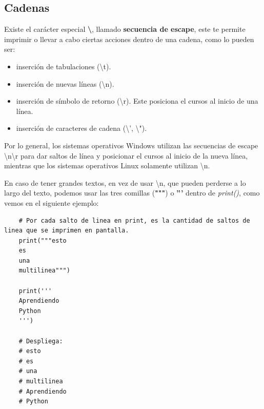 \subsection{Cadenas}
\hspace{0.55cm}Existe el carácter especial \textbf{\textbackslash}, llamado \textbf{secuencia de escape}, este te permite imprimir o llevar a cabo ciertas acciones dentro de una cadena, como lo pueden ser:
\begin{itemize}
	\item inserción de tabulaciones (\textbackslash t).
	\item inserción de nuevas líneas (\textbackslash n).
	\item inserción de símbolo de retorno (\textbackslash r). Este posiciona el cursos al inicio de una línea.
	\item inserción de caracteres de cadena (\textbackslash ', \textbackslash ").
\end{itemize}

Por lo general, los sistemas operativos Windows utilizan las secuencias de escape \textbackslash n\textbackslash r para dar saltos de línea y posicionar el cursos al inicio de la nueva línea, mientras que los sistemas operativos Linux solamente utilizan \textbackslash n.

En caso de tener grandes textos, en vez de usar \textbackslash n, que pueden perderse a lo largo del texto, podemos usar las tres comillas (\textbf{"""}) o \textbf{'''} dentro de \textit{print()}, como vemos en el siguiente ejemplo:
\begin{lstlisting}
	# Por cada salto de linea en print, es la cantidad de saltos de linea que se imprimen en pantalla.
	print("""esto
	es
	una
	multilinea""")
	
	print('''
	Aprendiendo
	Python	
	''')
	
	# Despliega:
	# esto
	# es
	# una
	# multilinea
	# Aprendiendo
	# Python
\end{lstlisting}


